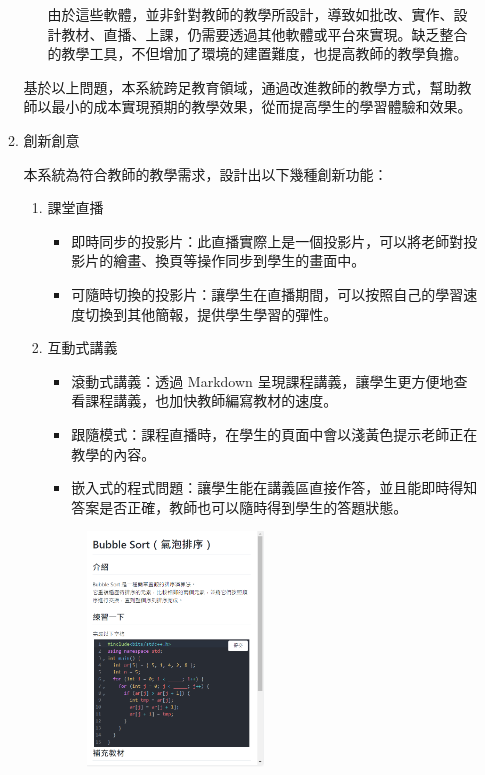 \documentclass[12pt]{article}
\begin{document}
\begin{enumerate}
\begin{enumerate}
\begin{enumerate}[label=(\arabic*)]
        \par 由於這些軟體，並非針對教師的教學所設計，導致如批改、實作、設計教材、直播、上課，仍需要透過其他軟體或平台來實現。缺乏整合的教學工具，不但增加了環境的建置難度，也提高教師的教學負擔。
    \end{enumerate}
    \par 基於以上問題，本系統跨足教育領域，通過改進教師的教學方式，幫助教師以最小的成本實現預期的教學效果，從而提高學生的學習體驗和效果。
    \item 創新創意
      \par 本系統為符合教師的教學需求，設計出以下幾種創新功能：
      \begin{enumerate}[label=(\arabic*)]
        \setlength{\parindent}{2em}
        \item 課堂直播
          \begin{itemize}
            \item 即時同步的投影片：此直播實際上是一個投影片，可以將老師對投影片的繪畫、換頁等操作同步到學生的畫面中。
            \item 可隨時切換的投影片：讓學生在直播期間，可以按照自己的學習速度切換到其他簡報，提供學生學習的彈性。
          \end{itemize}
        \item 互動式講義
          \begin{itemize}
            \item 滾動式講義：透過 Markdown 呈現課程講義，讓學生更方便地查看課程講義，也加快教師編寫教材的速度。
            \item 跟隨模式：課程直播時，在學生的頁面中會以淺黃色提示老師正在教學的內容。
            \item 嵌入式的程式問題：讓學生能在講義區直接作答，並且能即時得知答案是否正確，教師也可以隨時得到學生的答題狀態。
          \end{itemize}
          \begin{figure}[H]
            \centering
            \href{https://raw.githubusercontent.com/programingtw/proglearn-plan/main/img/interactiveMeterial.png}{ 
              \includegraphics[width=0.5\textwidth]{./img/interactiveMeterial.png}
}
\end{figure}
\end{enumerate}
\end{enumerate}
\end{enumerate}
\end{document}
